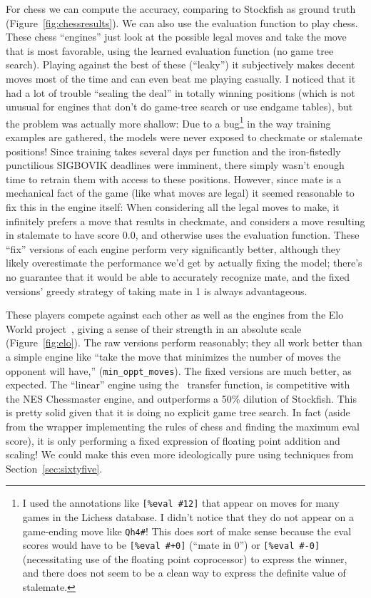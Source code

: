 \documentclass[twocolumn]{article}
\begin{document}
For chess we can compute the accuracy, comparing to Stockfish as
ground truth (Figure~\ref{fig:chessresults}). We can also use the
evaluation function to play chess. These chess ``engines'' just look
at the possible legal moves and take the move that is most favorable,
using the learned evaluation function (no game tree search). Playing
against the best of these (``leaky'') it subjectively makes decent
moves most of the time and can even beat me playing casually. I
noticed that it had a lot of trouble ``sealing the deal'' in totally
winning positions (which is not unusual for engines that don't do
game-tree search or use endgame tables), but the problem was actually
more shallow: Due to a bug\footnote{ I used the annotations like
  \verb|[%eval #12]| that appear on moves for many games in the
  Lichess database. I didn't notice that they do not appear on a
  game-ending move like \verb+Qh4#+! This does sort of make sense
  because the eval scores would have to be \verb|[%eval #+0]| (``mate
  in 0'') or \verb|[%eval #-0]| (necessitating use of the floating
  point coprocessor) to express the winner, and there does not seem to
  be a clean way to express the definite value of stalemate. } in the
way training examples are gathered, the models were never exposed to
checkmate or stalemate positions! Since training takes several days
per function and the iron-fistedly punctilious SIGBOVIK deadlines were
imminent, there simply wasn't enough time to retrain them with access
to these positions. However, since mate is a mechanical fact of the
game (like what moves are legal) it seemed reasonable to fix this in
the engine itself: When considering all the legal moves to make, it
infinitely prefers a move that results in checkmate, and considers a
move resulting in stalemate to have score 0.0, and otherwise uses the
evaluation function. These ``fix'' versions of each engine perform
very significantly better, although they likely overestimate the
performance we'd get by actually fixing the model; there's no
guarantee that it would be able to accurately recognize mate, and the
fixed versions' greedy strategy of taking mate in 1 is always
advantageous.

These players compete against each other as well as the engines from
the Elo World project~\cite{murphy2019eloworld}, giving a sense of
their strength in an absolute scale (Figure~\ref{fig:elo}). The raw
versions perform reasonably; they all work better than a simple engine
like ``take the move that minimizes the number of moves the opponent
will have,'' (\verb+min_oppt_moves+). The fixed versions are much
better, as expected. The ``linear'' engine using the
\gradone\ transfer function, is competitive with the NES Chessmaster
engine, and outperforms a 50\% dilution of Stockfish. This is pretty
solid given that it is doing no explicit game tree search. In fact
(aside from the wrapper implementing the rules of chess and finding
the maximum eval score), it is only performing a fixed expression of
floating point addition and scaling! We could make this even more
ideologically pure using techniques from Section~\ref{sec:sixtyfive}.
\end{document}
